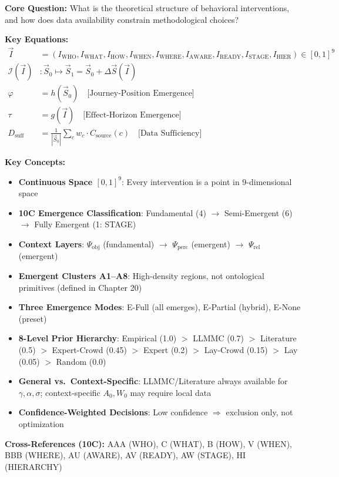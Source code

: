 \begin{tcolorbox}[colback=blue!5!white, colframe=blue!75!black,
    title=Quick Reference: Emergent Intervention Theory (EIT)]

\textbf{Core Question:} What is the theoretical structure of behavioral interventions, and how does data availability constrain methodological choices?

\textbf{Key Equations:}
\begin{align}
\vec{I} &= (I_{\text{WHO}}, I_{\text{WHAT}}, I_{\text{HOW}}, I_{\text{WHEN}}, I_{\text{WHERE}}, I_{\text{AWARE}}, I_{\text{READY}}, I_{\text{STAGE}}, I_{\text{HIER}}) \in [0,1]^9 \tag{EIT-1} \\
\mathcal{I}(\vec{I}) &: \vec{S}_0 \mapsto \vec{S}_1 = \vec{S}_0 + \Delta\vec{S}(\vec{I}) \tag{EIT-2} \\
\varphi &= h(\vec{S}_0) \quad \text{[Journey-Position Emergence]} \tag{EIT-4} \\
\tau &= g(\vec{I}) \quad \text{[Effect-Horizon Emergence]} \tag{EIT-5} \\
D_{\text{suff}} &= \frac{1}{|\vec{S}_0|} \sum_{c} w_c \cdot C_{\text{source}}(c) \quad \text{[Data Sufficiency]} \tag{IE-D1}
\end{align}

\textbf{Key Concepts:}
\begin{itemize}[nosep]
\item \textbf{Continuous Space $[0,1]^9$}: Every intervention is a point in 9-dimensional space
\item \textbf{10C Emergence Classification}: Fundamental (4) $\rightarrow$ Semi-Emergent (6) $\rightarrow$ Fully Emergent (1: STAGE)
\item \textbf{Context Layers}: $\Psi_{\text{obj}}$ (fundamental) $\rightarrow$ $\Psi_{\text{perc}}$ (emergent) $\rightarrow$ $\Psi_{\text{rel}}$ (emergent)
\item \textbf{Emergent Clusters A1--A8}: High-density regions, not ontological primitives (defined in Chapter 20)
\item \textbf{Three Emergence Modes}: E-Full (all emerges), E-Partial (hybrid), E-None (preset)
\item \textbf{8-Level Prior Hierarchy}: Empirical (1.0) $>$ LLMMC (0.7) $>$ Literature (0.5) $>$ Expert-Crowd (0.45) $>$ Expert (0.2) $>$ Lay-Crowd (0.15) $>$ Lay (0.05) $>$ Random (0.0)
\item \textbf{General vs.\ Context-Specific}: LLMMC/Literature always available for $\gamma, \alpha, \sigma$; context-specific $A_0, W_0$ may require local data
\item \textbf{Confidence-Weighted Decisions}: Low confidence $\Rightarrow$ exclusion only, not optimization
\end{itemize}

\textbf{Cross-References (10C):} AAA (WHO), C (WHAT), B (HOW), V (WHEN), BBB (WHERE), AU (AWARE), AV (READY), AW (STAGE), HI (HIERARCHY)
\end{tcolorbox}

